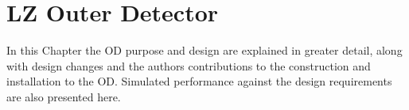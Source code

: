 \chapter{LZ Outer Detector}
\par
In this Chapter the OD purpose and design are explained in greater detail, along with design changes and the authors contributions to the construction and installation to the OD.
Simulated performance against the design requirements are also presented here.





